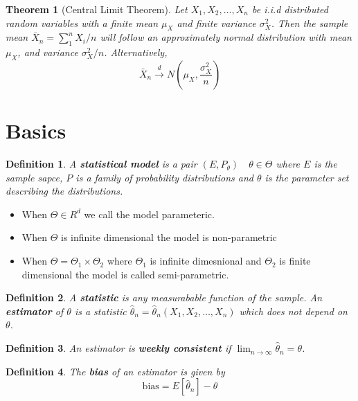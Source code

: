 \documentclass[10pt,a4paper]{article}
\newtheorem{definition}{Definition}
\newtheorem{theorem}{Theorem}
\begin{document}
\begin{theorem}[Central Limit Theorem]
	Let $X_1, X_2, \dots , X_n$ be i.i.d distributed random variables with a finite mean $\mu_X$ and finite variance $\sigma_X^2$.
	Then the sample mean $\bar X_n = \sum_1^n X_i /n$ will follow an approximately normal distribution with mean $\mu_X$, and variance $\sigma^2_X/n$. Alternatively,
	\begin{equation}
	\bar X_n \xrightarrow{d} N(\mu_X, \frac{\sigma^2_X}{n})
	\end{equation}
\end{theorem}

\section{Basics}

\begin{definition}
A \textbf{statistical model} is a pair $(E, P_\theta) \quad \theta\in \Theta$ where $E$ is the sample sapce, $P$ is a family of probability distributions and $\theta$ is the parameter set describing the distributions. 
\end{definition}
\begin{itemize}
	\item When $\Theta \in R^d$ we call the model parameteric.  
	\item When $\Theta$ is infinite dimensional the model is non-parametric
	\item When $\Theta = \Theta_1 \times \Theta_2$ where $\Theta_1$ is infinite dimesnional and $\Theta_2$ is finite dimensional the model is called semi-parametric.   
\end{itemize}

\begin{definition}
A \textbf{statistic} is any measurabable function of the sample.  An \textbf{estimator} of $\theta$ is a statistic $\hat \theta_n =  \hat \theta_n(X_1, X_2, \dots , X_n)$ which does not depend on $\theta$. 
\end{definition}

\begin{definition}
An estimator is \textbf{weekly consistent} if $\lim_{n \to \infty} \hat \theta_n = \theta$.
\end{definition}

\begin{definition}
The \textbf{bias} of an estimator is given by 
\begin{equation}
\text{bias} = E[\hat \theta_n] - \theta
\end{equation}
\end{definition}
\end{document}
